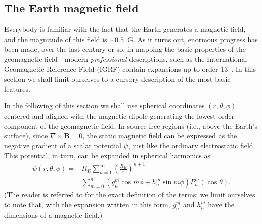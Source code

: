 \subsection{The Earth magnetic field}
\label{sec:geomagnetic_field}

Everybody is familiar with the fact that the Earth generates a magnetic field, and
the magnitude of this field is $\sim 0.5$~G. As it turns out, enormous progress
has been made, over the last century or so, in mapping the basic properties of the
geomagnetic field---modern \emph{professional} descriptions, such as the International
Geomagnetic Reference Field (IGRF) contain expansions up to order 13~\cite{2010GeoJI.183.1216F}.
In this section we shall limit ourselves to a cursory description of the most basic
features.

In the following of this section we shall use spherical coordinates
$(r, \theta, \phi)$ centered and aligned with the magnetic
dipole generating the lowest-order component of the geomagnetic field.
In source-free regions (i.e., above the Earth's surface), since
$\nabla \times {\mathbf B} = 0$, the static magnetic field can be expressed as
the negative gradient of a scalar potential $\psi$, just like the ordinary
electrostatic field. This potential, in turn, can be expanded in spherical
harmonics as
\begin{align}\label{eq:geomag_expansion}
  \psi(r, \theta, \phi) =&
  R_E \sum_{n=1}^{\infty}\left(\frac{R_E}{r}\right)^{n+1}\nonumber\\
  &\sum_{m=0}^{n}(g_n^m\cos m\phi + h_n^m\sin m\phi)P_n^m(\cos\theta).
\end{align}
(The reader is referred to \cite{1994Walt} for the exact definition of the
terms; we limit ourselves to note that, with the expansion written in this
form, $g_n^m$ and $h_n^m$ have the dimensions of a magnetic field.)


